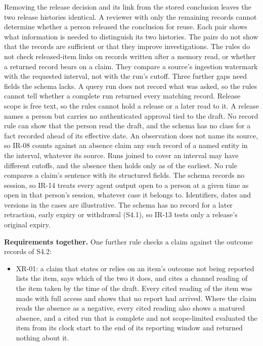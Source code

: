 \documentclass[
  11pt,
]{article}
\providecommand{\tightlist}{%
  \setlength{\itemsep}{0pt}\setlength{\parskip}{0pt}}
\renewcommand{\tightlist}{\setlength{\itemsep}{0pt plus 1pt}\setlength{\parskip}{0pt}}
\begin{document}
Removing the release decision and its link from the stored conclusion
leaves the two release histories identical. A reviewer with only the
remaining records cannot determine whether a person released the
conclusion for reuse. Each pair shows what information is needed to
distinguish its two histories. The pairs do not show that the records
are sufficient or that they improve investigations. The rules do not
check released-item links on records written after a memory read, or
whether a returned record bears on a claim. They compare a source's
ingestion watermark with the requested interval, not with the run's
cutoff. Three further gaps need fields the schema lacks. A query run
does not record what was asked, so the rules cannot tell whether a
complete run returned every matching record. Release scope is free text,
so the rules cannot hold a release or a later read to it. A release
names a person but carries no authenticated approval tied to the draft.
No record rule can show that the person read the draft, and the schema
has no class for a fact recorded ahead of its effective date. An
observation does not name its source, so \mbox{IR-08} counts against an
absence claim any such record of a named entity in the interval,
whatever its source. Runs joined to cover an interval may have different
cutoffs, and the absence then holds only as of the earliest. No rule
compares a claim's sentence with its structured fields. The schema
records no session, so \mbox{IR-14} treats every agent output open to a
person at a given time as open in that person's session, whatever case
it belongs to. Identifiers, dates and versions in the cases are
illustrative. The schema has no record for a later retraction, early
expiry or withdrawal (S4.1), so \mbox{IR-13} tests only a release's
original expiry.

\textbf{Requirements together.} One further rule checks a claim against
the outcome records of S4.2:

\begin{itemize}
\tightlist
\item
  \mbox{XR-01}: a claim that states or relies on an item's outcome not
  being reported lists the item, says which of the two it does, and
  cites a channel reading of the item taken by the time of the draft.
  Every cited reading of the item was made with full access and shows
  that no report had arrived. Where the claim reads the absence as a
  negative, every cited reading also shows a matured absence, and a
  cited run that is complete and not scope-limited evaluated the item
  from its clock start to the end of its reporting window and returned
  nothing about it.
\end{itemize}
\end{document}
